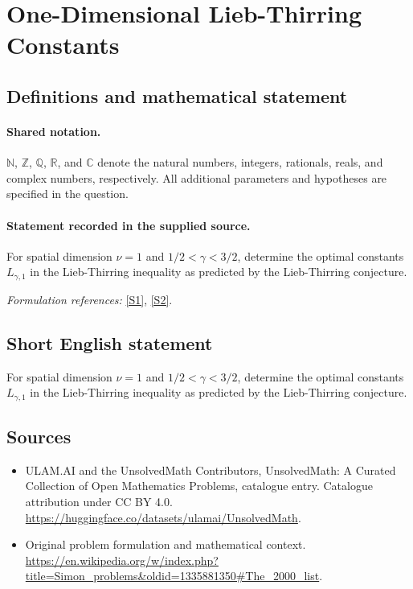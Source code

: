 \documentclass[11pt]{article}
\newcommand{\sref}[2]{\hyperlink{source:#1:#2}{[S#2]}}
\begin{document}
\section{One-Dimensional Lieb-Thirring Constants}\label{statement}

\subsection{Definitions and mathematical statement}

\paragraph{Shared notation.}$\mathbb N$, $\mathbb Z$, $\mathbb Q$, $\mathbb R$, and $\mathbb C$ denote the natural numbers, integers, rationals, reals, and complex numbers, respectively. All additional parameters and hypotheses are specified in the question.


\paragraph{Statement recorded in the supplied source.}
For spatial dimension $\nu=1$ and $1/2<\gamma<3/2$, determine the optimal constants $L_{\gamma,1}$ in the Lieb-Thirring inequality as predicted by the Lieb-Thirring conjecture.
\par\smallskip\textit{Formulation references:} \sref{statement}{1}, \sref{statement}{2}.
\subsection{Short English statement}
For spatial dimension $\nu=1$ and $1/2<\gamma<3/2$, determine the optimal constants $L_{\gamma,1}$ in the Lieb-Thirring inequality as predicted by the Lieb-Thirring conjecture.
\subsection{Sources}
\begin{itemize}
\item[\hypertarget{source:statement:1}{S1}] ULAM.AI and the UnsolvedMath Contributors, UnsolvedMath: A Curated Collection of Open Mathematics Problems, catalogue entry. Catalogue attribution under CC BY 4.0.
\url{https://huggingface.co/datasets/ulamai/UnsolvedMath}.
\item[\hypertarget{source:statement:2}{S2}] Original problem formulation and mathematical context.
\url{https://en.wikipedia.org/w/index.php?title=Simon_problems&oldid=1335881350#The_2000_list}.
\end{itemize}
\label{end:statement}
\end{document}
